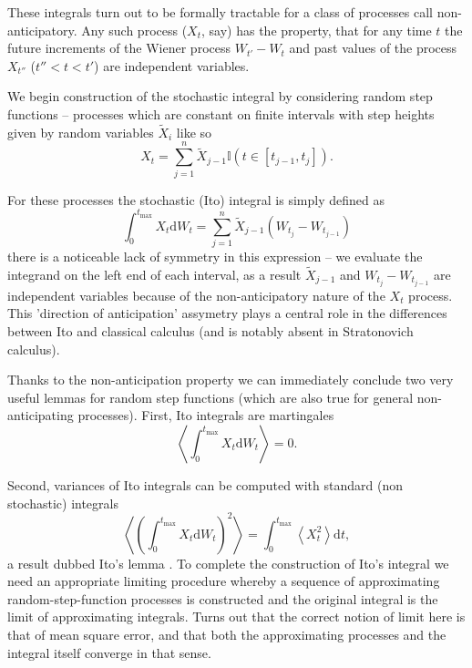 \documentclass{doctoral}
\newcommand{\dd}{\mathrm{d}}
\begin{document}
These integrals turn out to be formally tractable for a class of processes call non-anticipatory.
Any such process ($X_t$, say) has the property, that for any time $t$ the future increments of the Wiener process $W_{t'} - W_t$ and past values of the process $X_{t''}$ ($t'' < t < t'$) are independent variables.

We begin construction of the stochastic integral by considering random step functions -- processes which are constant on finite intervals with step heights given by random variables $\widetilde{X}_{i}$ like so
\begin{equation}
    X_t = \sum_{j=1}^{n} \widetilde{X}_{j-1} \mathbb{I}(t \in [t_{j-1},t_j]).
    \label{eqn:random-step-function}
\end{equation}

For these processes the stochastic (Ito) integral is simply defined as
\begin{equation}
    \int_0^{t_{\mathrm{max}}} X_t \dd W_t = \sum_{j=1}^{n} \widetilde{X}_{j-1} (W_{t_j} - W_{t_{j-1}}) \label{eqn:ito-integral-step-function}
\end{equation}
there is a noticeable lack of symmetry in this expression -- we evaluate the integrand on the left end of each interval, as a result $\widetilde{X}_{j-1}$ and $W_{t_j} - W_{t_{j-1}}$ are independent variables because of the non-anticipatory nature of the $X_t$ process.
This 'direction of anticipation' assymetry plays a central role in the differences between Ito and classical calculus (and is notably absent in Stratonovich calculus).

Thanks to the non-anticipation property we can immediately conclude two very useful lemmas for random step functions (which are also true for general non-anticipating processes).
First, Ito integrals are martingales
\begin{equation}
    \left< \int_0^{t_{\mathrm{max}}} X_t \dd W_t \right> = 0.
    \label{eqn:ito-integrals-are-martingales}
\end{equation}

Second, variances of Ito integrals can be computed with standard (non stochastic) integrals
\begin{equation}
    \left< \left( \int_0^{t_{\mathrm{max}}} X_t \dd W_t \right)^2 \right> = \int_{0}^{t_{\mathrm{max}}} \left< X_t^2 \right> \dd t, \label{eqn:itos-lemma}
\end{equation}
a result dubbed Ito's lemma \cite{Ito_1951}.
To complete the construction of Ito's integral we need an appropriate limiting procedure whereby a sequence of approximating random-step-function processes is constructed and the original integral is the limit of approximating integrals.
Turns out that the correct notion of limit here is that of mean square error, and that both the approximating processes and the integral itself converge in that sense.
\end{document}
